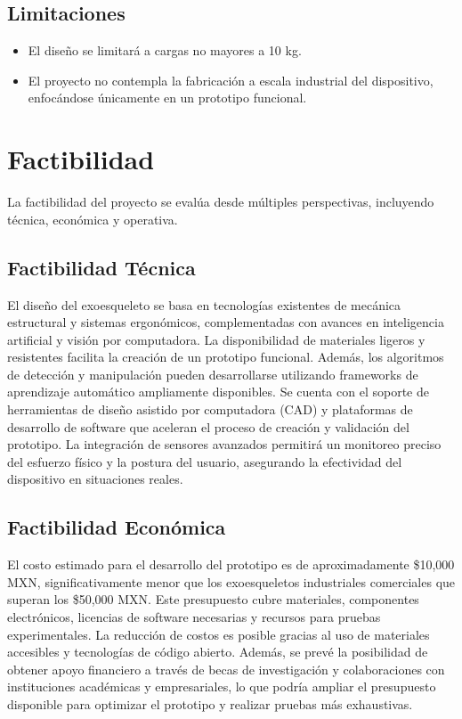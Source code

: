 \subsection{Limitaciones}
\begin{itemize}
    \item El diseño se limitará a cargas no mayores a 10 kg.
    \item El proyecto no contempla la fabricación a escala industrial del dispositivo, enfocándose únicamente en un prototipo funcional.
\end{itemize}


\section{Factibilidad}
La factibilidad del proyecto se evalúa desde múltiples perspectivas, incluyendo técnica, económica y operativa.

\subsection{Factibilidad Técnica}
El diseño del exoesqueleto se basa en tecnologías existentes de mecánica estructural y sistemas ergonómicos, complementadas con avances en inteligencia artificial y visión por computadora. La disponibilidad de materiales ligeros y resistentes facilita la creación de un prototipo funcional. Además, los algoritmos de detección y manipulación pueden desarrollarse utilizando frameworks de aprendizaje automático ampliamente disponibles. Se cuenta con el soporte de herramientas de diseño asistido por computadora (CAD) y plataformas de desarrollo de software que aceleran el proceso de creación y validación del prototipo. La integración de sensores avanzados permitirá un monitoreo preciso del esfuerzo físico y la postura del usuario, asegurando la efectividad del dispositivo en situaciones reales.

\subsection{Factibilidad Económica}
El costo estimado para el desarrollo del prototipo es de aproximadamente \$10,000 MXN, significativamente menor que los exoesqueletos industriales comerciales que superan los \$50,000 MXN. Este presupuesto cubre materiales, componentes electrónicos, licencias de software necesarias y recursos para pruebas experimentales. La reducción de costos es posible gracias al uso de materiales accesibles y tecnologías de código abierto. Además, se prevé la posibilidad de obtener apoyo financiero a través de becas de investigación y colaboraciones con instituciones académicas y empresariales, lo que podría ampliar el presupuesto disponible para optimizar el prototipo y realizar pruebas más exhaustivas.

